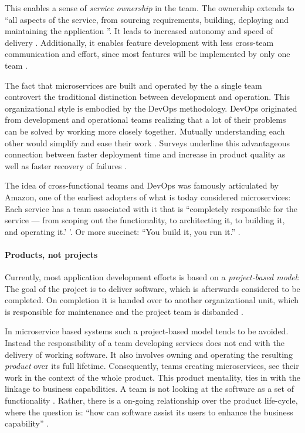 This enables a sense of \textit{service ownership} in the team.
The ownership extends to ``all aspects of the service, from sourcing requirements, building, deploying and maintaining the application \citep[p. 194]{Newman2015}''.
It leads to increased autonomy and speed of delivery \citep[p. 194]{Newman2015}. 
Additionally, it enables feature development with less cross-team communication and effort, since most features will be implemented by only one team \citep[p. 42]{Wolff2016}.

The fact that microservices are built and operated by the a single team controvert the traditional distinction between development and operation. 
This organizational style is embodied by the DevOps methodology.
DevOps originated from development and operational teams realizing that a lot of their problems can be solved by working more closely together.
Mutually understanding each other would simplify and ease their work \cite[5:00]{RadioDevOps}.
Surveys underline this advantageous connection between faster deployment time and increase in product quality as well as faster recovery of failures \cite[p. 4]{devopsReport2015}.

The idea of cross-functional teams and DevOps was famously articulated by Amazon, one of the earliest adopters of what is today considered microservices: 
Each service has a team associated with it that is ``completely responsible for the service — from scoping out the functionality, to architecting it, to building it, and operating it.' \citep{Vogels2006}'.
Or more succinct: ``You build it, you run it.'' \citep{Vogels2006}.

\paragraph{Products, not projects}
\label{bac:productsNotProjects}
Currently, most application development efforts is based on a \textit{project-based model}:
The goal of the project is to deliver software, which is afterwards considered to be completed.
On completion it is handed over to another organizational unit, which is responsible for maintenance and the project team is disbanded \cite{FowlerProductProjects2014}.

In microservice based systems such a project-based model tends to be avoided.
Instead the responsibility of a team developing services does not end with the delivery of working software. 
It also involves owning and operating the resulting \textit{product} over its full lifetime.  
Consequently, teams creating microservices, see their work in the context of the whole product.
This product mentality, ties in with the linkage to business capabilities.
A team is not looking at the software as a set of functionality \cite{FowlerProductProjects2014}.
Rather, there is a on-going relationship over the product life-cycle, where the question is: ``how can software assist its users to enhance the business capability'' \cite{FowlerProductProjects2014}.

